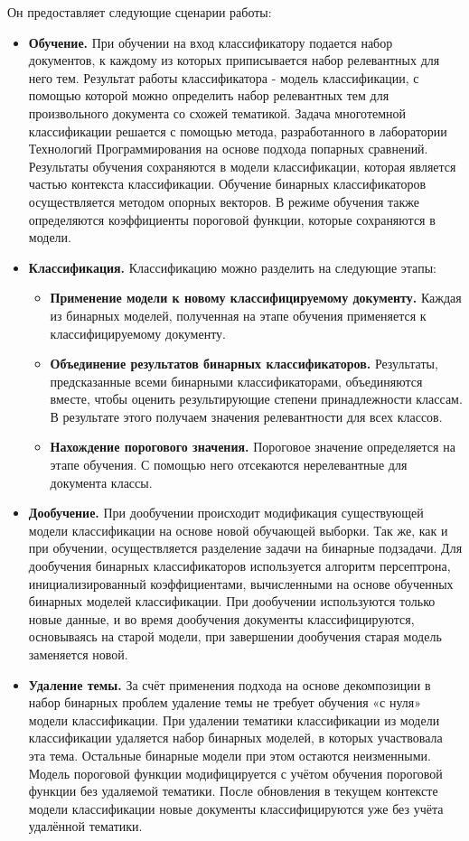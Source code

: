 \documentclass[russian, utf8, emptystyle]{eskdtext}
\begin{document}
Он предоставляет следующие сценарии работы:
\begin{itemize}
	\item {\bf Обучение.} При обучении на вход классификатору подается набор документов, к каждому из которых приписывается набор релевантных для него тем. Результат работы классификатора - модель классификации, с помощью которой можно определить набор релевантных тем для произвольного документа со схожей тематикой. Задача многотемной классификации решается с помощью метода, разработанного в лаборатории Технологий Программирования на основе подхода попарных сравнений. Результаты обучения сохраняются в модели классификации, которая является частью контекста классификации. Обучение бинарных классификаторов осуществляется методом опорных векторов.  В режиме обучения также определяются коэффициенты пороговой функции, которые сохраняются в модели. 
	
	\item {\bf Классификация.} 
	Классификацию можно разделить на следующие этапы:
	\begin{itemize}
		\item {\bf Применение  модели к новому классифицируемому документу.}
		Каждая из бинарных моделей, полученная на этапе обучения применяется к классифицируемому документу.
		\item {\bf Объединение результатов бинарных классификаторов.} Результаты, предсказанные всеми бинарными классификаторами, объединяются вместе, чтобы оценить результирующие степени принадлежности классам. В результате этого получаем значения релевантности для всех классов.
		\item {\bf Нахождение порогового значения.} Пороговое значение определяется на этапе обучения. С помощью него отсекаются нерелевантные для документа классы.
	\end{itemize}
	\item {\bf Дообучение.} При дообучении происходит модификация существующей модели классификации на основе новой обучающей выборки. Так же, как и при обучении, осуществляется разделение задачи на бинарные подзадачи. Для дообучения бинарных классификаторов используется алгоритм персептрона, инициализированный коэффициентами, вычисленными на основе обученных бинарных  моделей классификации. При дообучении используются только новые данные, и во время дообучения документы классифицируются, основываясь на старой модели, при завершении дообучения старая модель заменяется новой.
	\item {\bf Удаление темы.} За счёт применения подхода на основе декомпозиции в набор бинарных проблем удаление темы не требует обучения «с нуля» модели классификации. При удалении тематики классификации из модели классификации удаляется набор бинарных моделей, в которых участвовала эта тема. Остальные бинарные модели при этом остаются неизменными. Модель пороговой функции модифицируется с учётом обучения пороговой функции без удаляемой тематики. После обновления в текущем контексте модели классификации новые документы классифицируются уже без учёта удалённой тематики.
\end{itemize}
\end{document}
